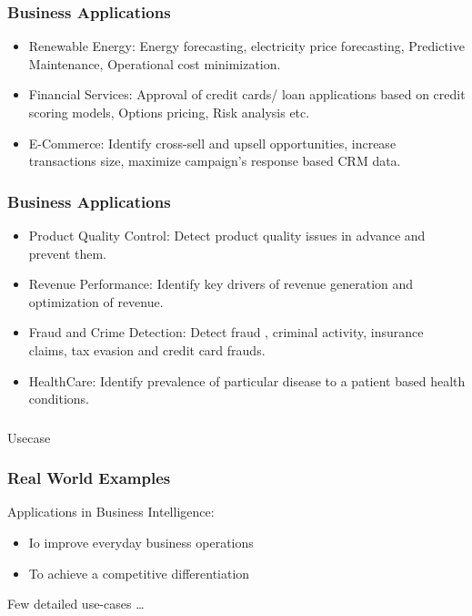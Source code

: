 \begin{frame}\frametitle{Business Applications}
\begin{itemize}
\item Renewable Energy:
Energy forecasting, electricity price forecasting, Predictive
Maintenance, Operational cost minimization.
\item Financial Services:
Approval of credit cards/ loan applications based on credit scoring
models, Options pricing, Risk analysis etc.
\item E-Commerce:
Identify cross-sell and upsell opportunities, increase transactions
size, maximize campaign's response based CRM data.
\end{itemize}
\end{frame}

\begin{frame}\frametitle{Business Applications}
\begin{itemize}
\item Product Quality Control:
Detect product quality issues in advance and prevent them.
\item  Revenue Performance:
Identify key drivers of revenue generation and optimization of
revenue.
\item  Fraud and Crime Detection:
Detect fraud , criminal activity, insurance claims, tax evasion and
credit card frauds.
\item HealthCare:
Identify prevalence of particular disease to a patient based health
conditions.

\end{itemize}
\end{frame}


\begin{frame}[fragile]\frametitle{}
\begin{center}
{\Large Usecase}
\end{center}
\end{frame}



\begin{frame}\frametitle{Real World Examples}
Applications in Business Intelligence:
\begin{itemize}
\item Io improve everyday business operations
\item To achieve a competitive differentiation
\end{itemize}

Few detailed use-cases \ldots
\end{frame}

